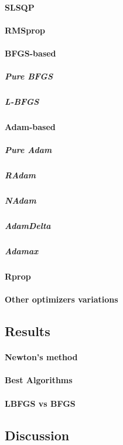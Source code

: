 \paragraph{SLSQP}
\paragraph{RMSprop}
\paragraph{BFGS-based}
\subparagraph{Pure BFGS}
\subparagraph{L-BFGS}
\paragraph{Adam-based}
\subparagraph{Pure Adam}
\subparagraph{RAdam}
\subparagraph{NAdam}
\subparagraph{AdamDelta}
\subparagraph{Adamax}
\paragraph{Rprop}
\paragraph{Other optimizers variations}

\subsection{Results}
\paragraph{Newton's method}
\paragraph{Best Algorithms}
\paragraph{LBFGS vs BFGS}

\subsection{Discussion}
